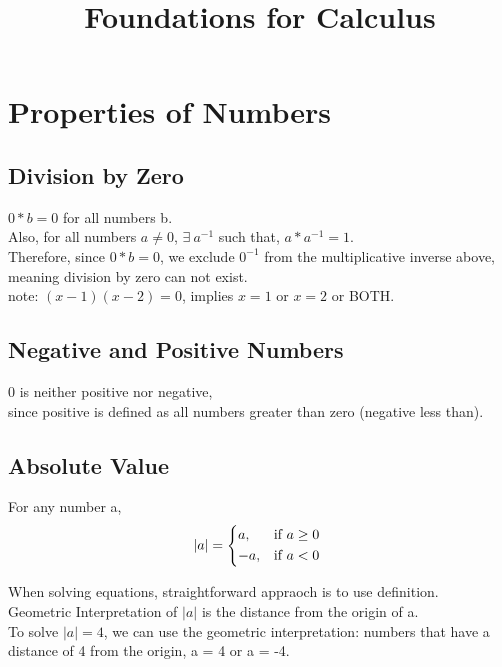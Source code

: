 \documentclass[12pt]{article}
\title{Foundations for Calculus}
\date{}
\begin{document}
\maketitle

\section{Properties of Numbers}
\subsection{Division by Zero}

$0 * b = 0$ for all numbers b. \\
Also, for all numbers $a \neq 0$, $\exists \ a^{-1}$ such that, $ a * a^{-1} = 1$.\\

\noindent Therefore, since $0 * b = 0$, we exclude $0^{-1}$ from the multiplicative inverse above, 
meaning division by zero can not exist. \\

note: $(x - 1) (x - 2) = 0$, implies $x = 1$ or $x =2$ or BOTH.


\subsection{Negative and Positive Numbers}
0 is neither positive nor negative,\\ 
since positive is defined as all numbers greater than zero (negative less than). 

\subsection{Absolute Value}
For any number a, \\
\[
|a| =  
    \begin{dcases*}
        a, & if $a \geq 0$ \\ 
        -a, & if $a < 0$
    \end{dcases*}
\]

When solving equations, straightforward appraoch is to use definition.\\

Geometric Interpretation of $|a|$ is the distance from the origin of a. \\

\noindent To solve $|a| = 4$, we can use the geometric interpretation: numbers that have a distance of 4 from the origin, a = 4 or a = -4. \\
\end{document}
